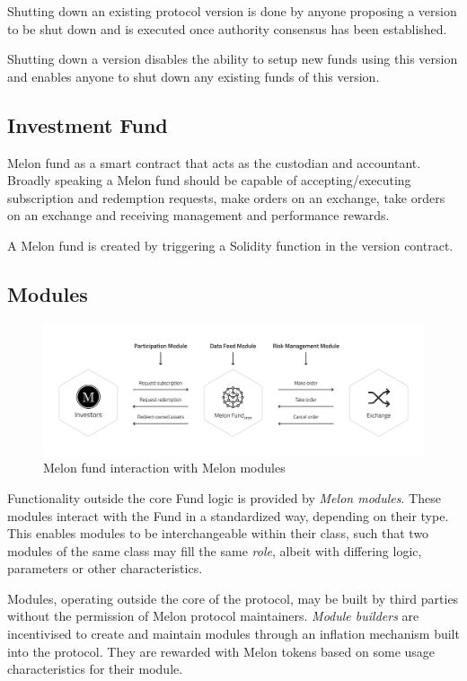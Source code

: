 \documentclass[conference]{IEEEtran}
\begin{document}
Shutting down an existing protocol version is done by anyone proposing a version to be shut down and is executed once authority consensus has been established.

Shutting down a version disables the ability to setup new funds using this version and enables anyone to shut down any existing funds of this version.

\subsection{Investment Fund} \label{fund}

Melon fund as a smart contract that acts as the custodian and accountant. Broadly speaking a Melon fund should be capable of accepting/executing subscription and redemption requests, make orders on an exchange, take orders on an exchange and
receiving management and performance rewards.

A Melon fund is created by triggering a Solidity function in the version contract.

\subsection{Modules}

\begin{figure}[ht!]
	\centering
	\includegraphics[width=135mm]{images/fund.png}
	\caption{Melon fund interaction with Melon modules\label{fig:fund}}
\end{figure}

Functionality outside the core Fund logic is provided by \textit{Melon modules}. These modules interact with the Fund in a standardized way, depending on their type.
This enables modules to be interchangeable within their class, such that two modules of the same class may fill the same \textit{role}, albeit with differing logic, parameters or other characteristics.

Modules, operating outside the core of the protocol, may be built by third parties without the permission of Melon protocol maintainers.
\textit{Module builders} are incentivised to create and maintain modules through an inflation mechanism built into the protocol. 
They are rewarded with Melon tokens based on some usage characteristics for their module.
\end{document}
